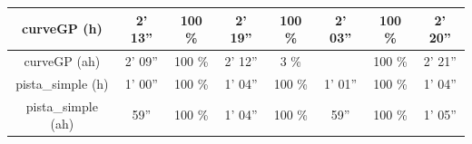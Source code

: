 \begin{table}[H]
\begin{tabular}{c|c|c|c|c|c|c|c|}
\multicolumn{1}{|c|}{curveGP (h)}     & 2' 13''           & 100 \%           & 2' 19''            & 100 \%        & 2' 03''           & 100 \%       & 2' 20''      \\ \hline
\multicolumn{1}{|c|}{curveGP (ah)}       & 2' 09''            & 100 \%         & 2' 12''            & 3 \%        &           & 100 \%      & 2' 21''     \\ \hline
\multicolumn{1}{|c|}{pista\_simple (h)}       & 1' 00''           & 100 \%          & 1' 04''            & 100 \%        & 1' 01''             & 100 \%      & 1' 04''       \\ \hline
\multicolumn{1}{|c|}{pista\_simple (ah)}     & 59''            & 100 \%          & 1' 04''          & 100 \%        & 59''             & 100 \%      & 1' 05''        \\ \hline
\end{tabular}
\end{table}


